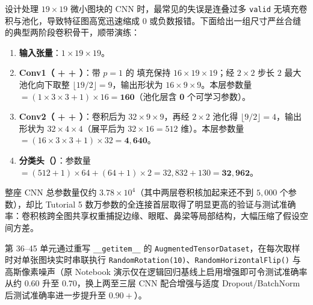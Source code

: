 
设计处理 $19\times 19$ 微小图块的 CNN 时，最常见的失误是连叠过多 \texttt{valid} 无填充卷积与池化，导致特征图高宽迅速缩成 $0$ 或负数报错。下面给出一组尺寸严丝合缝的典型两阶段卷积骨干，顺带演练：
\begin{enumerate}
\item \textbf{输入张量}：$1 \times 19 \times 19$。
\item \textbf{Conv1（ +  + ）}：带 $p=1$ 的  填充保持 $16 \times 19 \times 19$；经 $2\times 2$ 步长 $2$ 最大池化向下取整 $\lfloor 19/2\rfloor = 9$，输出形状为 $16 \times 9 \times 9$。本层参数量 $= (1\times 3\times 3 + 1)\times 16 = \mathbf{160}$（池化层含 \textbf{0} 个可学习参数）。
\item \textbf{Conv2（ +  + ）}：卷积后为 $32 \times 9 \times 9$，再经 $2\times 2$ 池化得 $\lfloor 9/2\rfloor = 4$，输出形状为 $32 \times 4 \times 4$（展平后为 $32\times 16 = 512$ 维）。本层参数量 $= (16\times 3\times 3 + 1)\times 32 = \mathbf{4{,}640}$。
\item \textbf{分类头（）}：参数量 $= (512+1)\times 64 + (64+1)\times 2 = 32{,}832 + 130 = \mathbf{32{,}962}$。
\end{enumerate}

整座 CNN 总参数量仅约 $3.78\times 10^4$（其中两层卷积核加起来还不到 $5{,}000$ 个参数），却比 Tutorial 5 数万参数的全连接首层取得了明显更高的验证与测试准确率：卷积核跨全图共享权重捕捉边缘、眼眶、鼻梁等局部结构，大幅压缩了假设空间方差。



第 36–45 单元通过重写 \texttt{\_\_getitem\_\_} 的 \texttt{AugmentedTensorDataset}，在每次取样时对单张图块实时串联执行 \texttt{RandomRotation(10)}、\texttt{RandomHorizontalFlip()} 与高斯像素噪声（原 Notebook 演示仅在逻辑回归基线上启用增强即可令测试准确率从约 $0.60$ 升至 $0.70$，换上两至三层 CNN 配合增强与适度 Dropout/BatchNorm 后测试准确率进一步提升至 $0.90+$）。

